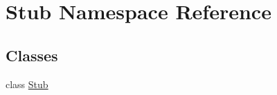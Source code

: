 \hypertarget{namespaceStub}{}\section{Stub Namespace Reference}
\label{namespaceStub}
\subsection*{Classes}
\begin{DoxyCompactItemize}
\item 
class \hyperlink{classStub_1_1Stub}{Stub}
\end{DoxyCompactItemize}
